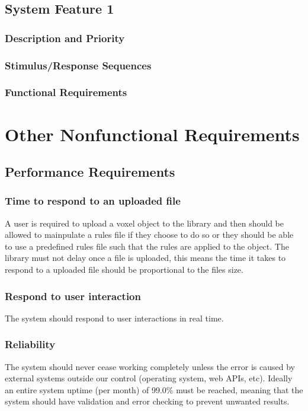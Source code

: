 \documentclass[english]{article}
\begin{document}
		\subsection{System Feature 1}
		
			 \subsubsection{Description and Priority}
			 
			 \subsubsection{Stimulus/Response Sequences}
			 
			 \subsubsection{Functional Requirements}
			 
	\pagebreak
	
	\section{Other Nonfunctional Requirements}
	
		\subsection{Performance Requirements}
		\subsubsection {Time to respond to an uploaded file}
		A user is required to upload a voxel object to the library and then should be allowed to mainpulate a rules file if they choose to do so or they should be able to use a predefined rules file such that the rules are applied to the object. The library must not delay once a file is uploaded, this means the time it takes to respond to a uploaded file should be proportional to the files size.
		
		\subsubsection{Respond to user interaction}
		The system should respond to user interactions in real time.
		
		\subsubsection{Reliability}
		The system should never cease working completely unless the error is caused by external systems outside our control (operating system, web APIs, etc). Ideally an entire system uptime (per month) of 99.0\% must be reached, meaning that the system should have validation and error checking to prevent unwanted results.
		
\end{document}

